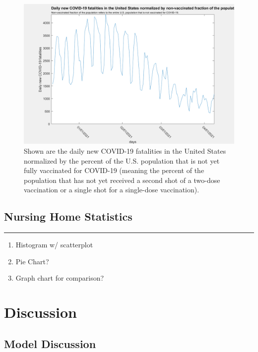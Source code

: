 \documentclass[twoside]{article}
\begin{document}
\begin{multicols}{2}
\begin{figure}[H]
	\includegraphics[width=\linewidth]{images/usa_normalized_fatalities_vf.png}
	\caption{Shown are the daily new COVID-19 fatalities in the United States normalized by the percent of the U.S. population that is not yet fully vaccinated for COVID-19 (meaning the percent of the population that has not yet received a second shot of a two-dose vaccination or a single shot for a single-dose vaccination).}
	\label{fig:images/usa_normalized_fatalities_vfLabel}
\end{figure}


\subsection{Nursing Home Statistics}
\rule{\linewidth}{0.25pt}

\begin{enumerate}
	\item Histogram w/ scatterplot 
	\item Pie Chart?
	\item Graph chart for comparison?
\end{enumerate}


\section{Discussion}

\subsection{Model Discussion}


\end{multicols}
\end{document}
